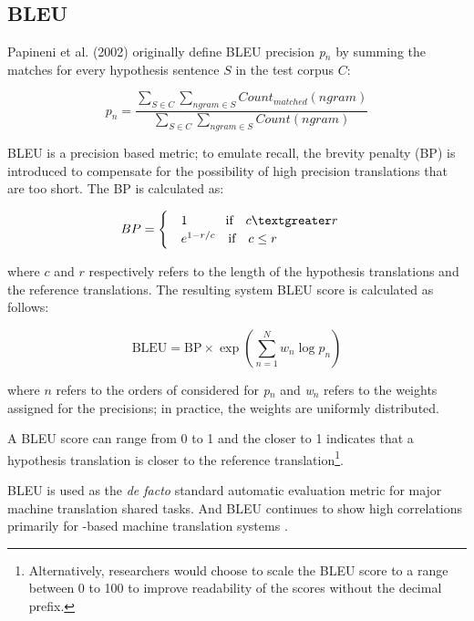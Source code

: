 \subsection{BLEU}

Papineni et al. (2002) originally define BLEU \ngram{} precision \emph{p$_n$} by summing the \ngram{} matches for every hypothesis sentence $S$ in the test corpus $C$:

\begin{equation}\label{eq:bleu-precision}
{ p }_{ n }=\frac { \sum _{ S\in C }^{  }{ \sum _{ ngram\in S }^{  }{ { Count }_{ matched } } (ngram) }  }{ \sum _{ S\in C }^{  }{ \sum _{ ngram\in S }^{  }{ { Count } } (ngram) }  }
\end{equation}

BLEU is a precision based metric; to emulate recall, the brevity penalty (BP) is introduced to compensate for the possibility of high precision translations that are too short. The BP is calculated as:

\begin{equation}\label{eq:bleu-brevity}
BP = \begin{cases}
	\quad 1 \quad \qquad \text{if} \quad c \textgreater r \\
	\quad { e }^{ 1 -r/c} \quad \text{if} \quad c \le r
\end{cases}
\end{equation}

where $c$ and $r$ respectively refers to the length of the hypothesis translations and the reference translations.
The resulting system BLEU score is calculated as follows:

\begin{equation}
	\text{BLEU} = \text{BP} \times  \exp(\sum _{ n=1 }^{ N }{ { w }_{ n } \log { { p }_{ n } }  })
\end{equation}

where $n$ refers to the orders of \ngram{} considered for \emph{p$_n$} and \emph{w$_n$} refers to the weights assigned for the \ngram{} precisions; in practice, the weights are uniformly distributed.

A BLEU score can range from 0 to 1 and the closer to 1 indicates that a hypothesis translation is closer to the reference translation\footnote{Alternatively, researchers would choose to scale the BLEU score to a range between 0 to 100 to improve readability of the scores without the decimal prefix.}.

BLEU is used as the \textit{de facto} standard automatic evaluation metric for major machine translation shared tasks. And BLEU continues to show high correlations primarily for \ngram{}-based machine translation systems \citep{WMT15,nakazawa2014overview}.

